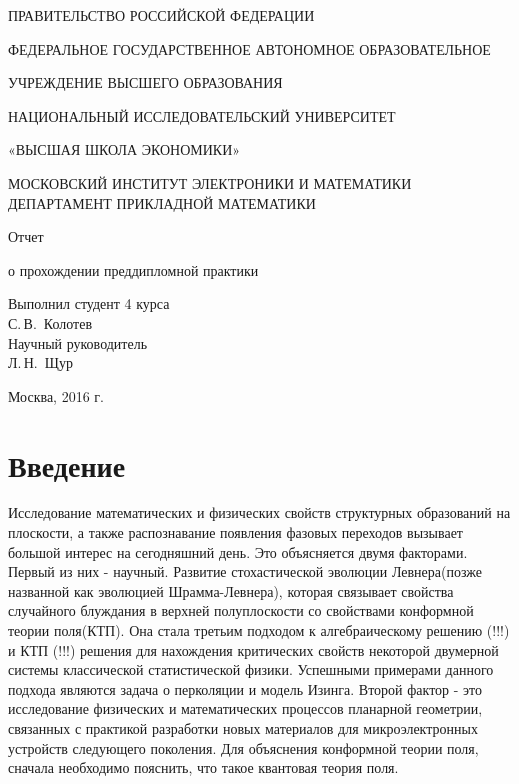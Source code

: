 \documentclass[12pt,a4paper]{article}
\begin{document}
	
	\begin{titlepage}
		\begin{center}
			\large
			ПРАВИТЕЛЬСТВО РОССИЙСКОЙ ФЕДЕРАЦИИ
			
			ФЕДЕРАЛЬНОЕ ГОСУДАРСТВЕННОЕ АВТОНОМНОЕ ОБРАЗОВАТЕЛЬНОЕ 
			
			УЧРЕЖДЕНИЕ ВЫСШЕГО ОБРАЗОВАНИЯ
			
			НАЦИОНАЛЬНЫЙ ИССЛЕДОВАТЕЛЬСКИЙ УНИВЕРСИТЕТ
			
			«ВЫСШАЯ ШКОЛА ЭКОНОМИКИ»\\[12pt]
			\vspace{0.25cm}
			
			МОСКОВСКИЙ ИНСТИТУТ ЭЛЕКТРОНИКИ И МАТЕМАТИКИ
			ДЕПАРТАМЕНТ ПРИКЛАДНОЙ МАТЕМАТИКИ
			
			\vspace{2cm}
			
			{\large Отчет 
				
				о прохождении преддипломной практики}
			\bigskip
		\end{center}
		\vfill
		
		\hfill\begin{minipage}{0.35\textwidth}
			Выполнил студент 4 курса\\
			С.\,В.~Колотев\\
			
			
			Научный руководитель\\
			Л.\,Н.~Щур\\
		\end{minipage}%
		\bigskip
		\vfill
		
		
		\begin{center}
			Москва, 2016 г.
		\end{center}
	\end{titlepage}
	
	\renewcommand\contentsname{Оглавление}
	\section{Введение}
	
	\par Исследование математических и физических свойств структурных образований на плоскости, а также распознавание появления фазовых переходов вызывает большой интерес на сегодняшний день. Это объясняется двумя факторами. Первый из них - научный. Развитие стохастической эволюции Левнера(позже названной как эволюцией Шрамма-Левнера), которая связывает свойства случайного блуждания в верхней полуплоскости со свойствами конформной теории поля(КТП). Она стала третьим подходом к алгебраическому решению (!!!) и КТП (!!!) решения для нахождения критических свойств некоторой двумерной системы классической статистической физики. Успешными примерами данного подхода являются задача о перколяции и модель Изинга. Второй фактор - это исследование физических и математических процессов планарной геометрии, связанных с практикой разработки новых материалов для микроэлектронных устройств следующего поколения. Для объяснения конформной теории поля, сначала необходимо пояснить, что такое квантовая теория поля. 
	
\end{document}

